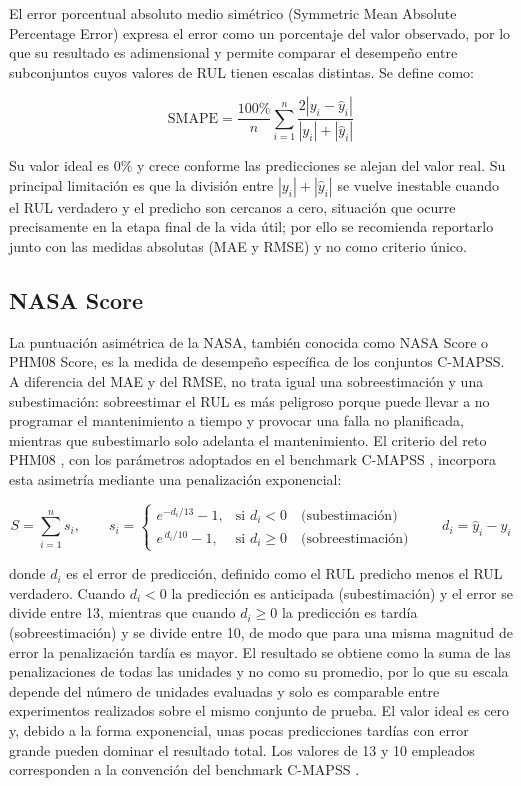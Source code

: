 El error porcentual absoluto medio simétrico (Symmetric Mean Absolute Percentage Error) expresa el error como un porcentaje del valor observado, por lo que su resultado es adimensional y permite comparar el desempeño entre subconjuntos cuyos valores de RUL tienen escalas distintas. Se define como:

\[
\mathrm{SMAPE} = \frac{100\%}{n} \sum_{i=1}^{n} \frac{2\left| y_i - \hat{y}_i \right|}{\left| y_i \right| + \left| \hat{y}_i \right|}
\]

Su valor ideal es $0\%$ y crece conforme las predicciones se alejan del valor real. Su principal limitación es que la división entre $|y_i| + |\hat{y}_i|$ se vuelve inestable cuando el RUL verdadero y el predicho son cercanos a cero, situación que ocurre precisamente en la etapa final de la vida útil; por ello se recomienda reportarlo junto con las medidas absolutas (MAE y RMSE) y no como criterio único.\\[.15cm]

\subsection{NASA Score}

La puntuación asimétrica de la NASA, también conocida como NASA Score o PHM08 Score, es la medida de desempeño específica de los conjuntos C-MAPSS. A diferencia del MAE y del RMSE, no trata igual una sobreestimación y una subestimación: sobreestimar el RUL es más peligroso porque puede llevar a no programar el mantenimiento a tiempo y provocar una falla no planificada, mientras que subestimarlo solo adelanta el mantenimiento. El criterio del reto PHM08 \cite{saxena2008}, con los parámetros adoptados en el benchmark C-MAPSS \cite{ramasso2014}, incorpora esta asimetría mediante una penalización exponencial:

\[
S = \sum_{i=1}^{n} s_i, \qquad
s_i =
\begin{cases}
e^{-d_i/13} - 1, & \text{si } d_i < 0 \quad \text{(subestimación)} \\
e^{\,d_i/10} - 1, & \text{si } d_i \geq 0 \quad \text{(sobreestimación)}
\end{cases}
\qquad d_i = \hat{y}_i - y_i
\]

donde $d_i$ es el error de predicción, definido como el RUL predicho menos el RUL verdadero. Cuando $d_i < 0$ la predicción es anticipada (subestimación) y el error se divide entre 13, mientras que cuando $d_i \geq 0$ la predicción es tardía (sobreestimación) y se divide entre 10, de modo que para una misma magnitud de error la penalización tardía es mayor. El resultado se obtiene como la suma de las penalizaciones de todas las unidades y no como su promedio, por lo que su escala depende del número de unidades evaluadas y solo es comparable entre experimentos realizados sobre el mismo conjunto de prueba. El valor ideal es cero y, debido a la forma exponencial, unas pocas predicciones tardías con error grande pueden dominar el resultado total. Los valores de 13 y 10 empleados corresponden a la convención del benchmark C-MAPSS \cite{ramasso2014}.

